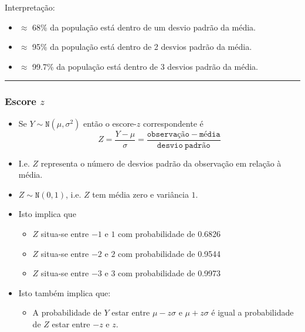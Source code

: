 \documentclass[]{article}
\providecommand{\tightlist}{%
  \setlength{\itemsep}{0pt}\setlength{\parskip}{0pt}}
\begin{document}
Interpretação:

\begin{itemize}
\tightlist
\item
  \(\approx\) 68\% da população está dentro de um desvio padrão da
  média.
\item
  \(\approx\) 95\% da população está dentro de 2 desvios padrão da
  média.
\item
  \(\approx\) 99.7\% da população está dentro de 3 desvios padrão da
  média.
\end{itemize}

\begin{center}\rule{0.5\linewidth}{\linethickness}\end{center}

\subsubsection{\texorpdfstring{Escore \(z\)}{Escore z}}\label{escore-z}

\begin{itemize}
\tightlist
\item
  Se \(Y\sim \texttt{N}(\mu,\sigma^2)\) então o escore-\(z\)
  correspondente é
  \[Z=\frac{Y-\mu}{\sigma}=\frac{\mathtt{observação-média}}{\mathtt{desvio\
    padrão}}\]
\item
  I.e. \(Z\) representa o número de desvios padrão da observação em
  relação à média.
\item
  \(Z\sim \texttt{N}(0,1)\), i.e. \(Z\) tem média zero e variância
  \(1\).
\item
  Isto implica que

  \begin{itemize}
  \tightlist
  \item
    \(Z\) situa-se entre \(-1\) e \(1\) com probabilidade de 0.6826
  \item
    \(Z\) situa-se entre \(-2\) e \(2\) com probabilidade de 0.9544
  \item
    \(Z\) situa-se entre \(-3\) e \(3\) com probabilidade de 0.9973
  \end{itemize}
\item
  Isto também implica que:

  \begin{itemize}
  \tightlist
  \item
    A probabilidade de \(Y\) estar entre \(\mu - z\sigma\) e
    \(\mu + z\sigma\) é igual a probabilidade de \(Z\) estar entre
    \(-z\) e \(z\).
  \end{itemize}
\end{itemize}
\end{document}
